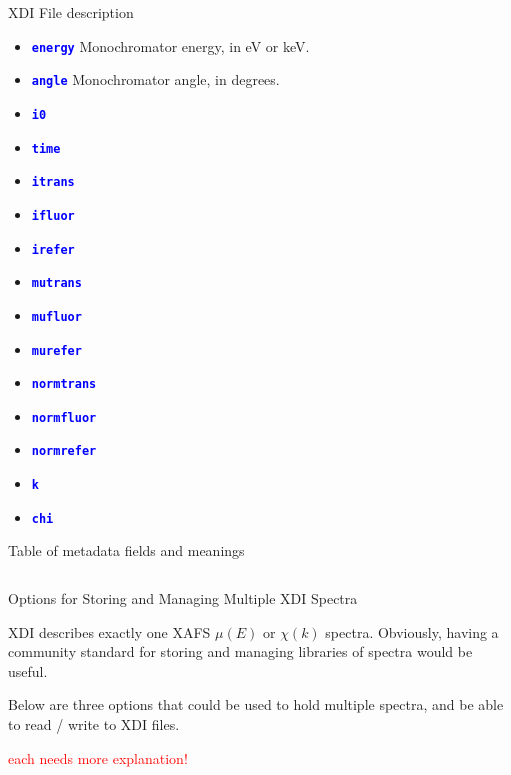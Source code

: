 \documentclass[final]{beamer}
\newcommand{\Color}[2]{{\textcolor{#1}{#2}}}
\newcommand{\Red}[1]{{\Color{Red}{#1}}}
\newcommand{\Blue}[1]{{\Color{Blue}{\bf{#1}}}}
\begin{document}
\begin{frame}{}
\begin{columns}[t]
\begin{column}{.45\linewidth}
\begin{block}{\large XDI File description}
         \begin{itemize}
         \item {\Blue{\tt{energy}}}  Monochromator energy, in eV or keV.
         \item {\Blue{\tt{angle}}}   Monochromator angle, in degrees.
         \item {\Blue{\tt{i0}}}
         \item {\Blue{\tt{time}}}
         \item {\Blue{\tt{itrans}}}
         \item {\Blue{\tt{ifluor}}}
         \item {\Blue{\tt{irefer}}}
         \item {\Blue{\tt{mutrans}}}
         \item {\Blue{\tt{mufluor}}}
         \item {\Blue{\tt{murefer}}}
         \item {\Blue{\tt{normtrans}}}
         \item {\Blue{\tt{normfluor}}}
         \item {\Blue{\tt{normrefer}}}
         \item {\Blue{\tt{k}}}
         \item {\Blue{\tt{chi}}}
         \end{itemize}

          \vspace{6mm}

          Table of metadata fields and meanings
 
        \end{block}
      \end{column}
    \end{columns}
    \vfill

    \begin{block}{Options for Storing and Managing Multiple XDI Spectra}

      XDI describes exactly one XAFS $\mu(E)$ or $\chi(k)$ spectra.
      Obviously, having a community standard for storing and managing
      libraries of spectra would be useful.   

      \vspace{5mm}

      Below are three options that could be used to hold multiple spectra,
      and be able to read / write to XDI files.

      {\Red{ each needs more explanation!}}

    \end{block}


\end{frame}
\end{document}
